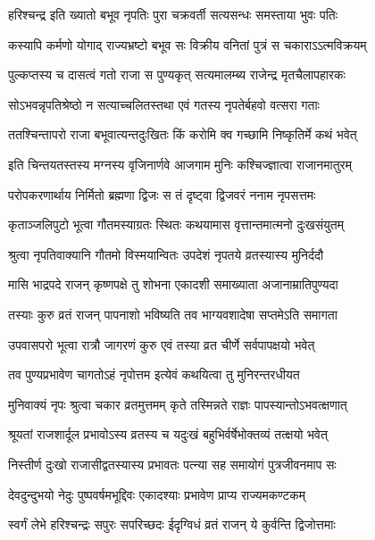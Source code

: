 \twolineshloka
{हरिश्चन्द्र इति ख्यातो बभूव नृपतिः पुरा}
{चक्रवर्ती सत्यसन्धः समस्ताया भुवः पतिः} %

\twolineshloka
{कस्यापि कर्मणो योगाद् राज्यभ्रष्टो बभूव सः}
{विक्रीय वनितां पुत्रं स चकाराऽऽत्मविक्रयम्} %

\twolineshloka
{पुल्कप्तस्य च दासत्वं गतो राजा स पुण्यकृत्}
{सत्यमालम्ब्य राजेन्द्र मृतचैलापहारकः} %

\twolineshloka
{सोऽभवन्नृपतिश्रेष्ठो न सत्याच्चलितस्तथा}
{एवं गतस्य नृपतेर्बहवो वत्सरा गताः} %

\twolineshloka
{ततश्चिन्तापरो राजा बभूवात्यन्तदुःखितः}
{किं करोमि क्व गच्छामि निष्कृतिर्मे कथं भवेत्} %

\twolineshloka
{इति चिन्तयतस्तस्य मग्नस्य वृजिनार्णवे}
{आजगाम मुनिः कश्चिज्ज्ञात्वा राजानमातुरम्} %

\twolineshloka
{परोपकरणार्थाय निर्मितो ब्रह्मणा द्विजः}
{स तं दृष्ट्वा द्विजवरं ननाम नृपसत्तमः} %

\twolineshloka
{कृताञ्जलिपुटो भूत्वा गौतमस्याग्रतः स्थितः}
{कथयामास वृत्तान्तमात्मनो दुःखसंयुतम्} %

\twolineshloka
{श्रुत्वा नृपतिवाक्यानि गौतमो विस्मयान्वितः}
{उपदेशं नृपतये व्रतस्यास्य मुनिर्ददौ} %

\twolineshloka
{मासि भाद्रपदे राजन् कृष्णपक्षे तु शोभना}
{एकादशी समाख्याता अजानाम्रातिपुण्यदा} %

\twolineshloka
{तस्याः कुरु व्रतं राजन् पापनाशो भविष्यति}
{तव भाग्यवशादेषा सप्तमेऽति समागता} %

\twolineshloka
{उपवासपरो भूत्वा रात्रौ जागरणं कुरु}
{एवं तस्या व्रत चीर्णे सर्वपापक्षयो भवेत्} %

\twolineshloka
{तव पुण्यप्रभावेण चागतोऽहं नृपोत्तम}
{इत्येवं कथयित्वा तु मुनिरन्तरधीयत} %

\twolineshloka
{मुनिवाक्यं नृपः श्रुत्वा चकार व्रतमुत्तमम्}
{कृते तस्मिन्नते राज्ञः पापस्यान्तोऽभवत्क्षणात्} %

\twolineshloka
{श्रूयतां राजशार्दूल प्रभावोऽस्य व्रतस्य च}
{यदुःखं बहुभिर्वर्षेभोक्तव्यं तत्क्षयो भवेत्} %

\twolineshloka
{निस्तीर्ण दुःखो राजासीद्वतस्यास्य प्रभावतः}
{पत्न्या सह समायोगं पुत्रजीवनमाप सः} %

\twolineshloka
{देवदुन्दुभयो नेदुः पुष्पवर्षमभूद्दिवः}
{एकादश्याः प्रभावेण प्राप्य राज्यमकण्टकम्} %

\twolineshloka
{स्वर्गं लेभे हरिश्चन्द्रः सपुरः सपरिच्छदः}
{ईदृग्विधं व्रतं राजन् ये कुर्वन्ति द्विजोत्तमाः} %

